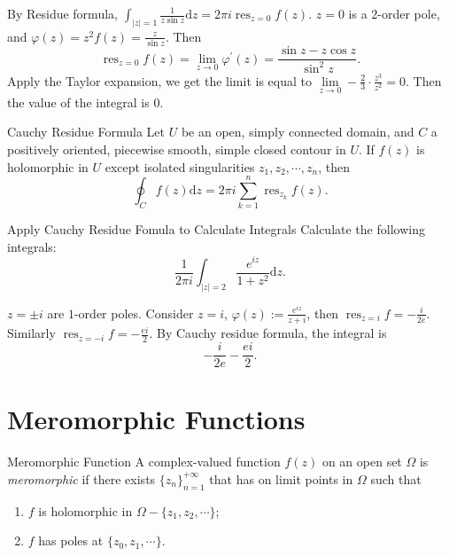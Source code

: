 \begin{solution}
  By Residue formula, $\int_{|z| = 1} \frac{1}{z \sin z}\mathrm{d} z = 2 \pi i \operatorname{res}_{z = 0}f(z)$.
  $z = 0$ is a $2$-order pole, and $\varphi(z) = z^2 f(z) = \frac{z}{\sin z}$.
  Then
  \begin{equation}
    \operatorname{res}_{z = 0} f(z)
    = \lim \limits _{z \rightarrow 0} \varphi^{\prime}(z)
    = \frac{\sin z - z \cos z}{\sin^2 z}.
  \end{equation}
  Apply the Taylor expansion, we get the limit is equal to
  $\lim \limits _{z \rightarrow 0} - \frac{2}{3} \cdot \frac{z^3}{z^2} = 0$.
  Then the value of the integral is $0$.
\end{solution}

\begin{corollary}{Cauchy Residue Formula}{}
  Let $U$ be an open, simply connected domain, and $C$ a positively oriented, piecewise smooth,
  simple closed contour in $U$.
  If $f(z)$ is holomorphic in $U$ except isolated singularities $z_1,z_2,\cdots,z_n$, then
  \begin{equation}
    \oint_C f(z)\mathrm{d} z
    =
    2 \pi i \sum\limits_{k = 1}^n \operatorname{res}_{z_k}f(z).
  \end{equation}
\end{corollary}

\begin{example}{Apply Cauchy Residue Fomula to Calculate Integrals}{}
  Calculate the following integrals:
  \begin{equation}
    \frac{1}{2\pi i} \int_{|z| = 2} \frac{e^{iz}}{1 + z^2}\mathrm{d} z.
  \end{equation}
\end{example}

\begin{solution}
  $z = \pm i$ are $1$-order poles. Consider $z = i$, $\varphi(z) := \frac{e^{iz}}{z + i}$,
  then $\operatorname{res}_{z = i} f = - \frac{i}{2e}$.
  Similarly $\operatorname{res}_{z = -i} f = - \frac{e i}{2}$.
  By Cauchy residue formula, the integral is
  \begin{equation}
    - \frac{i}{2e} - \frac{e i}{2}.
  \end{equation}
\end{solution}

\section{Meromorphic Functions}

\begin{definition}{Meromorphic Function}{}
  A complex-valued function $f(z)$ on an open set $\Omega$ is \emph{meromorphic} if there exists
  $\{z_n\}_{n=1}^{+\infty}$ that has on limit points in $\Omega$ such that
  \begin{enumerate}
  \item $f$ is holomorphic in $\Omega - \{z_1,z_2,\cdots\}$;
  \item $f$ has poles at $\{z_0,z_1,\cdots\}$.
  \end{enumerate}
\end{definition}


